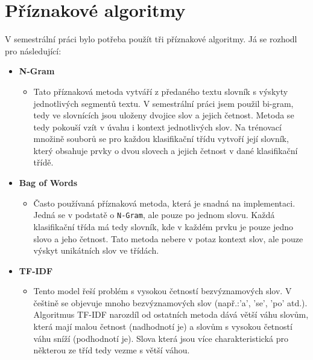 \documentclass[
12pt,
a4paper,
pdftex,
czech,
titlepage
]{report}
\begin{document}
\section{Příznakové algoritmy}
V semestrální práci bylo potřeba použít tři příznakové algoritmy. Já se rozhodl pro následující:
\begin{itemize}
\item{\textbf{N-Gram}
\begin{itemize}
\item{Tato příznaková metoda vytváří z předaného textu slovník s výskyty jednotlivých segmentů textu. V semestrální práci jsem použil bi-gram, tedy ve slovnících jsou uloženy dvojice slov a jejich četnost. Metoda se tedy pokouší vzít v úvahu i kontext jednotlivých slov. Na trénovací množině souborů se pro každou klasifikační třídu vytvoří její slovník, který obsahuje prvky o dvou slovech a jejich četnost v dané klasifikační třídě.}
\end{itemize}}
\item{\textbf{Bag of Words}
\begin{itemize}
\item{Často používaná příznaková metoda, která je snadná na implementaci. Jedná se v podstatě o \texttt{N-Gram}, ale pouze po jednom slovu. Každá klasifikační třída má tedy slovník, kde v každém prvku je pouze jedno slovo a jeho četnost. Tato metoda nebere v potaz kontext slov, ale pouze výskyt unikátních slov ve třídách.}
\end{itemize}}
\item{\textbf{TF-IDF}
\begin{itemize}
\item{Tento model řeší problém s vysokou četností bezvýznamových slov. V češtině se objevuje mnoho bezvýznamových slov (např.:'a', 'se', 'po' atd.). Algoritmus TF-IDF narozdíl od ostatních metoda dává větší váhu slovům, která mají malou četnost (nadhodnotí je) a slovům s vysokou četností váhu sníží (podhodnotí je). Slova která jsou více charakteristická pro některou ze tříd tedy vezme s větší váhou.}
\end{itemize}}
\end{itemize}
\end{document}
